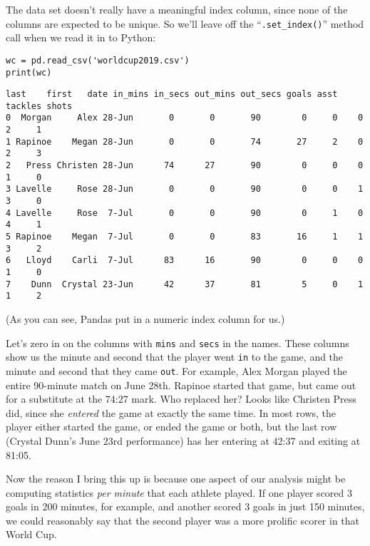 
The data set doesn't really have a meaningful index column, since none of the
columns are expected to be unique. So we'll leave off the
``\texttt{.set\_index()}'' method call when we read it in to Python:

\begin{samepage}
\begin{Verbatim}[fontsize=\footnotesize,samepage=true,frame=single,framesep=3mm]
wc = pd.read_csv('worldcup2019.csv')
print(wc)
\end{Verbatim}
\vspace{-.2in}

\begin{Verbatim}[fontsize=\scriptsize,samepage=true,frame=leftline,framesep=5mm,framerule=1mm]
     last    first   date in_mins in_secs out_mins out_secs goals asst tackles shots
0  Morgan     Alex 28-Jun       0       0       90        0     0    0       2     1
1 Rapinoe    Megan 28-Jun       0       0       74       27     2    0       2     3
2   Press Christen 28-Jun      74      27       90        0     0    0       1     0
3 Lavelle     Rose 28-Jun       0       0       90        0     0    1       3     0
4 Lavelle     Rose  7-Jul       0       0       90        0     1    0       4     1
5 Rapinoe    Megan  7-Jul       0       0       83       16     1    1       3     2
6   Lloyd    Carli  7-Jul      83      16       90        0     0    0       1     0
7    Dunn  Crystal 23-Jun      42      37       81        5     0    1       1     2
\end{Verbatim}
\end{samepage}

(As you can see, Pandas put in a numeric index column for us.)

Let's zero in on the columns with \texttt{mins} and \texttt{secs} in the names.
These columns show us the minute and second that the player went \texttt{in} to
the game, and the minute and second that they came \texttt{out}. For example,
Alex Morgan played the entire 90-minute match on June 28th. Rapinoe started
that game, but came out for a substitute at the 74:27 mark. Who replaced her?
Looks like Christen Press did, since she \textit{entered} the game at exactly
the same time. In most rows, the player either started the game, or ended the
game or both, but the last row (Crystal Dunn's June 23rd performance) has her
entering at 42:37 and exiting at 81:05.

Now the reason I bring this up is because one aspect of our analysis might be
computing statistics \textit{per minute} that each athlete played. If one
player scored 3 goals in 200 minutes, for example, and another scored 3 goals
in just 150 minutes, we could reasonably say that the second player was a more
prolific scorer in that World Cup.

